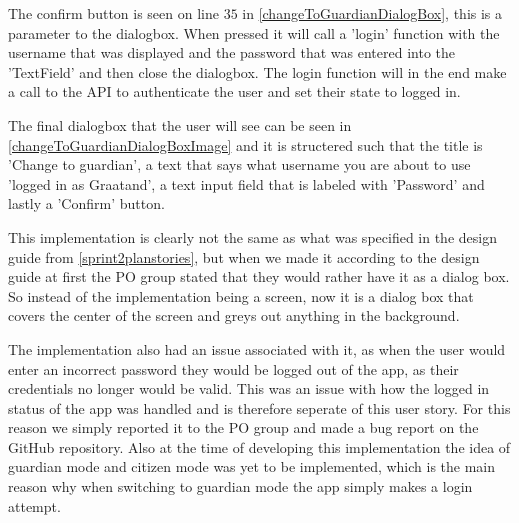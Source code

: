 The confirm button is seen on line $35$ in \autoref{changeToGuardianDialogBox}, this is a parameter to the dialogbox.
When pressed it will call a 'login' function with the username that was displayed and the password that was entered into the 'TextField' and then close the dialogbox.
The login function will in the end make a call to the API to authenticate the user and set their state to logged in.

The final dialogbox that the user will see can be seen in \autoref{changeToGuardianDialogBoxImage} and it is structered such that the title is 'Change to guardian', a text that says what username you are about to use 'logged in as Graatand', a text input field that is labeled with 'Password' and lastly a 'Confirm' button.



This implementation is clearly not the same as what was specified in the design guide from \autoref{sprint2planstories}, but when we made it according to the design guide at first the PO group stated that they would rather have it as a dialog box. 
So instead of the implementation being a screen, now it is a dialog box that covers the center of the screen and greys out anything in the background.

The implementation also had an issue associated with it, as when the user would enter an incorrect password they would be logged out of the app, as their credentials no longer would be valid. 
This was an issue with how the logged in status of the app was handled and is therefore seperate of this user story. 
For this reason we simply reported it to the PO group and made a bug report on the GitHub repository.
Also at the time of developing this implementation the idea of guardian mode and citizen mode was yet to be implemented, which is the main reason why when switching to guardian mode the app simply makes a login attempt.

